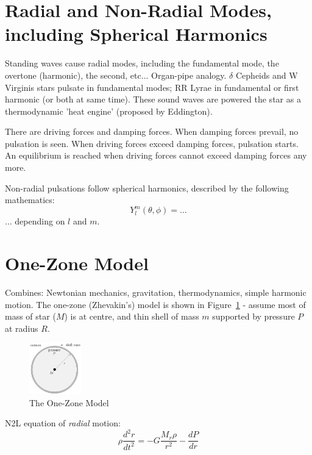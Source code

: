 \documentclass{spy}
\begin{document}
\section{Radial and Non-Radial Modes, including Spherical Harmonics}
Standing waves cause radial modes, including the fundamental mode, the overtone (harmonic), the second, etc... Organ-pipe analogy. 
\(\delta\) Cepheids and W Virginis stars pulsate in fundamental modes; RR Lyrae in fundamental or first harmonic (or both at same time).  
These sound waves are powered the star as a thermodynamic 'heat engine' (proposed by Eddington). 

There are driving forces and damping forces. When damping forces prevail, no pulsation is seen. When driving forces exceed damping forces, pulsation starts. An equilibrium is reached when driving forces cannot exceed damping forces any more. 

Non-radial pulsations follow spherical harmonics, described by the following mathematics:
\begin{equation}
    Y^m_l (\theta, \phi) = ...
\end{equation}
... depending on \(l\) and \(m\). 


\section{One-Zone Model}
Combines: Newtonian mechanics, gravitation, thermodynamics, simple harmonic motion.
The one-zone (Zhevakin's) model is shown in Figure~\ref{one_zone_model_diagram} - assume most of mass of star (\(M\)) is at centre, and thin shell of mass \(m\) supported by pressure \(P\) at radius \(R\). 



\begin{figure}[h]
    \centering
    \includegraphics[width=0.2\textwidth]{one_zone_model.eps}
    \caption{The One-Zone Model} 
    \label{one_zone_model_diagram}
\end{figure}

N2L equation of \textit{radial} motion:
\begin{equation}
    \rho \frac{d^2r}{dt^2} = -G \frac{M_r \rho}{r^2} - \frac{dP}{dr}
\end{equation}
\end{document}
